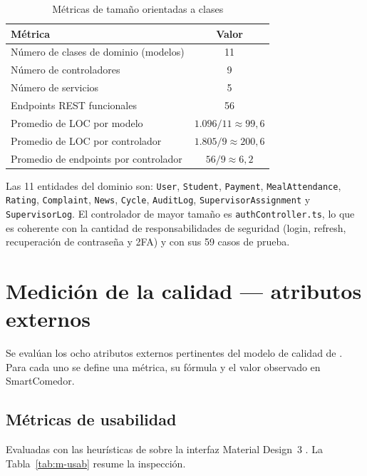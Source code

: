 \begin{table}[H]\centering
\caption{Métricas de tamaño orientadas a clases}\label{tab:clases-tam}
\begin{tabularx}{\textwidth}{X c}
\toprule \textbf{Métrica} & \textbf{Valor} \\ \midrule
Número de clases de dominio (modelos) & 11 \\
Número de controladores & 9 \\
Número de servicios & 5 \\
Endpoints REST funcionales & 56 \\
Promedio de LOC por modelo & $1.096/11 \approx 99{,}6$ \\
Promedio de LOC por controlador & $1.805/9 \approx 200{,}6$ \\
Promedio de endpoints por controlador & $56/9 \approx 6{,}2$ \\
\bottomrule
\end{tabularx}
\end{table}

Las 11 entidades del dominio son: \texttt{User}, \texttt{Student}, \texttt{Payment},
\texttt{MealAttendance}, \texttt{Rating}, \texttt{Complaint}, \texttt{News},
\texttt{Cycle}, \texttt{AuditLog}, \texttt{SupervisorAssignment} y
\texttt{SupervisorLog}. El controlador de mayor tamaño es \texttt{authController.ts}, lo
que es coherente con la cantidad de responsabilidades de seguridad (login, refresh,
recuperación de contraseña y 2FA) y con sus 59 casos de prueba.

\section{Medición de la calidad — atributos externos}
Se evalúan los ocho atributos externos pertinentes del modelo de calidad de
\textcite{iso25010}. Para cada uno se define una métrica, su fórmula y el valor
observado en SmartComedor.

\subsection{Métricas de usabilidad}
Evaluadas con las heurísticas de \textcite{nielsen1994} sobre la interfaz Material
Design~3 \parencite{material3}. La Tabla~\ref{tab:m-usab} resume la inspección.

